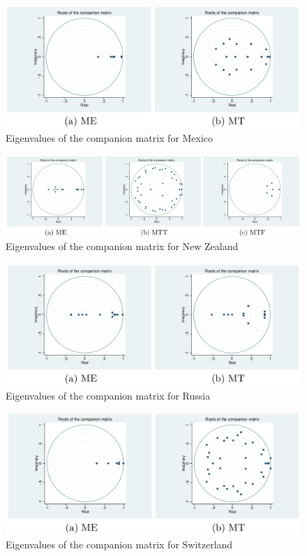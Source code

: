 \documentclass[a4paper, twoside]{templates/ociamthesis}
\begin{document}
\begin{figure}[!ht]

{\centering \includegraphics[width=0.66\linewidth]{figure/MXN} 

}

\caption{Eigenvalues of the companion matrix for Mexico}\label{fig:FigureE6}
\end{figure}

\begin{figure}[!ht]

{\centering \includegraphics[width=0.99\linewidth]{figure/NZD} 

}

\caption{Eigenvalues of the companion matrix for New Zealand}\label{fig:FigureE7}
\end{figure}

\clearpage

\begin{figure}[!ht]

{\centering \includegraphics[width=0.66\linewidth]{figure/RBL} 

}

\caption{Eigenvalues of the companion matrix for Russia}\label{fig:FigureE8}
\end{figure}

\begin{figure}[!ht]

{\centering \includegraphics[width=0.66\linewidth]{figure/CHF} 

}

\caption{Eigenvalues of the companion matrix for Switzerland}\label{fig:FigureE9}
\end{figure}
\end{document}
